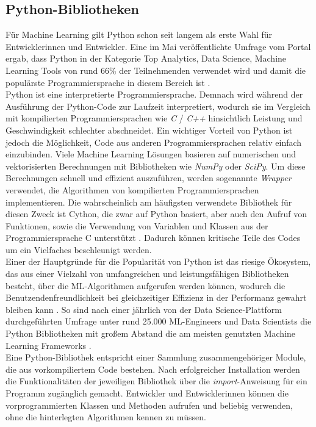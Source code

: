 \documentclass[german,bachelor]{swsLeipzig}
\begin{document}
\subsection{Python-Bibliotheken}
Für Machine Learning gilt Python schon seit langem als erste Wahl für Entwicklerinnen und Entwickler.
Eine im Mai \citeyear{nugget} veröffentlichte Umfrage vom Portal \citeauthor{nugget} ergab, dass Python in der Kategorie
\glqq Top Analytics, Data Science, Machine Learning Tools\grqq{} von rund 66\% der Teilnehmenden verwendet wird
und damit die populärste Programmiersprache in diesem Bereich ist \cite[]{nugget}. \\
\indent Python ist eine interpretierte Programmiersprache.
Demnach wird während der Ausführung der Python-Code zur Laufzeit interpretiert, wodurch sie im Vergleich mit kompilierten
Programmiersprachen wie \textit{C} / \textit{C++} hinsichtlich Leistung und Geschwindigkeit schlechter abschneidet.
Ein wichtiger Vorteil von Python ist jedoch die Möglichkeit, Code aus anderen Programmiersprachen relativ einfach einzubinden.
Viele Machine Learning Lösungen basieren auf numerischen und vektorisierten Berechnungen mit Bibliotheken
wie \textit{NumPy} oder \textit{SciPy}.
Um diese Berechnungen schnell und effizient auszuführen, werden sogenannte \textit{Wrapper} verwendet,
die Algorithmen von kompilierten Programmiersprachen implementieren.
Die wahrscheinlich am häufigsten verwendete Bibliothek für diesen Zweck ist Cython, die zwar auf Python basiert,
aber auch den Aufruf von Funktionen, sowie die Verwendung von Variablen und Klassen aus der Programmiersprache C unterstützt \cite[]{8757088}.
Dadurch können kritische Teile des Codes um ein Vielfaches beschleunigt werden. \\
\indent Einer der Hauptgründe für die Popularität von Python ist das riesige Ökosystem, das aus einer Vielzahl
von umfangreichen und leistungsfähigen Bibliotheken besteht, über die ML-Algorithmen aufgerufen werden können,
wodurch die Benutzendenfreundlichkeit bei gleichzeitiger Effizienz in der Performanz gewahrt bleiben kann \cite[]{2020}.
So sind nach einer jährlich von der Data Science-Plattform \citeauthor{kaggle} durchgeführten Umfrage unter rund 25.000 ML-Engineers
und Data Scientists die Python Bibliotheken mit großem Abstand die am meisten genutzten Machine Learning Frameworks \cite[]{kaggle}.\\
\indent Eine Python-Bibliothek entspricht einer Sammlung zusammengehöriger Module, die aus vorkompiliertem Code bestehen.
Nach erfolgreicher Installation werden die Funktionalitäten der jeweiligen Bibliothek über die \textit{import}-Anweisung für ein Programm zugänglich
gemacht.
Entwickler und Entwicklerinnen können die vorprogrammierten Klassen und Methoden aufrufen und beliebig verwenden,
ohne die hinterlegten Algorithmen kennen zu müssen.
\end{document}
